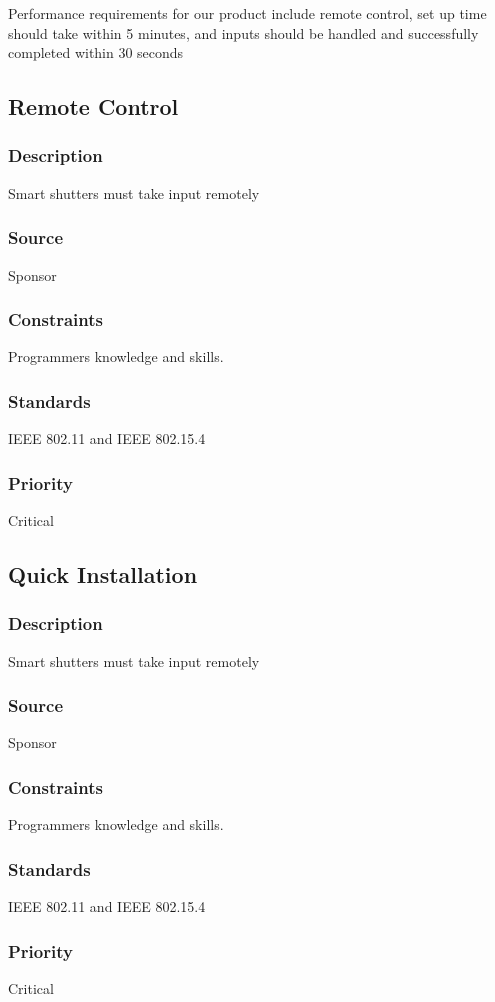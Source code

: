 Performance requirements for our product include remote control, set up time should take within 5 minutes, and inputs should be handled and successfully completed within 30 seconds


\subsection{Remote Control}
\subsubsection{Description}
Smart shutters must take input remotely 
\subsubsection{Source}
Sponsor
\subsubsection{Constraints}
Programmers knowledge and skills.
\subsubsection{Standards}
IEEE 802.11 and IEEE 802.15.4
\subsubsection{Priority}
Critical

\subsection{Quick Installation}
\subsubsection{Description}
Smart shutters must take input remotely 
\subsubsection{Source}
Sponsor
\subsubsection{Constraints}
Programmers knowledge and skills.
\subsubsection{Standards}
IEEE 802.11 and IEEE 802.15.4
\subsubsection{Priority}
Critical

